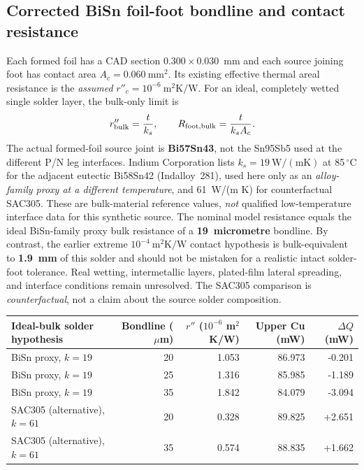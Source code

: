 \subsection{Corrected BiSn foil-foot bondline and contact resistance}
Each formed foil has a CAD section \(0.300\times0.030\)~mm and each source joining foot has contact area \(A_c=0.060\ \mathrm{mm^2}\). Its existing effective thermal areal resistance is the \emph{assumed} \(r''_c=10^{-6}\ \mathrm{m^2 K/W}\). For an ideal, completely wetted single solder layer, the bulk-only limit is
\[
 r''_{\rm bulk}=\frac{t}{k_s},\qquad
 R_{\rm foot,bulk}=\frac{t}{k_s A_c}.
\]
The actual formed-foil source joint is \textbf{Bi57Sn43}, not the Sn95Sb5 used at the different P/N leg interfaces. Indium Corporation lists \(k_s=19\ \mathrm{W/(m K)}\) at 85\,$^\circ$C for the adjacent eutectic Bi58Sn42 (Indalloy~281), used here only as an \emph{alloy-family proxy at a different temperature}, and 61~W/(m K) for counterfactual SAC305. These are bulk-material reference values, \emph{not} qualified low-temperature interface data for this synthetic source. The nominal model resistance equals the ideal BiSn-family proxy bulk resistance of a \textbf{19~micrometre} bondline. By contrast, the earlier extreme \(10^{-4}\ \mathrm{m^2K/W}\) contact hypothesis is bulk-equivalent to \textbf{1.9~mm} of this solder and should not be mistaken for a realistic intact solder-foot tolerance. Real wetting, intermetallic layers, plated-film lateral spreading, and interface conditions remain unresolved. The SAC305 comparison is \emph{counterfactual}, not a claim about the source solder composition.

\begin{center}\small
\begin{tabular}{lrrrr}\toprule
Ideal-bulk solder hypothesis & Bondline (\(\mu\)m) & \(r''\) (\(10^{-6}\) m\(^2\)K/W) & Upper Cu (mW) & \(\Delta Q\) (mW)\\\midrule
BiSn proxy, \(k=19\) & 20 & 1.053 & 86.973 & -0.201\\
BiSn proxy, \(k=19\) & 25 & 1.316 & 85.985 & -1.189\\
BiSn proxy, \(k=19\) & 35 & 1.842 & 84.079 & -3.094\\
SAC305 (alternative), \(k=61\) & 20 & 0.328 & 89.825 & +2.651\\
SAC305 (alternative), \(k=61\) & 35 & 0.574 & 88.835 & +1.662\\\bottomrule
\end{tabular}
\end{center}

